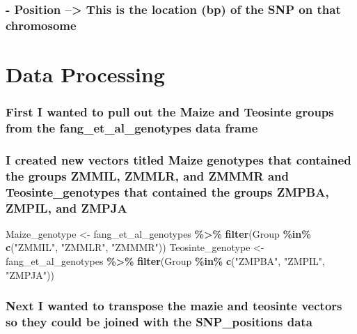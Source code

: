 \documentclass[
]{article}
\newenvironment{Shaded}{\begin{snugshade}}{\end{snugshade}}
\newcommand{\FunctionTok}[1]{\textcolor[rgb]{0.13,0.29,0.53}{\textbf{#1}}}
\newcommand{\NormalTok}[1]{#1}
\newcommand{\OtherTok}[1]{\textcolor[rgb]{0.56,0.35,0.01}{#1}}
\newcommand{\SpecialCharTok}[1]{\textcolor[rgb]{0.81,0.36,0.00}{\textbf{#1}}}
\newcommand{\StringTok}[1]{\textcolor[rgb]{0.31,0.60,0.02}{#1}}
\begin{document}
\subsubsection{- Position --\textgreater{} This is the location (bp) of
the SNP on that
chromosome}\label{position-this-is-the-location-bp-of-the-snp-on-that-chromosome}

\section{Data Processing}\label{data-processing}

\subsubsection{First I wanted to pull out the Maize and Teosinte groups
from the fang\_et\_al\_genotypes data
frame}\label{first-i-wanted-to-pull-out-the-maize-and-teosinte-groups-from-the-fang_et_al_genotypes-data-frame}

\subsubsection{I created new vectors titled Maize genotypes that
contained the groups ZMMIL, ZMMLR, and ZMMMR and Teosinte\_genotypes
that contained the groups ZMPBA, ZMPIL, and
ZMPJA}\label{i-created-new-vectors-titled-maize-genotypes-that-contained-the-groups-zmmil-zmmlr-and-zmmmr-and-teosinte_genotypes-that-contained-the-groups-zmpba-zmpil-and-zmpja}

\begin{Shaded}
\begin{Highlighting}[]
\NormalTok{Maize\_genotype }\OtherTok{\textless{}{-}}\NormalTok{ fang\_et\_al\_genotypes }\SpecialCharTok{\%\textgreater{}\%} \FunctionTok{filter}\NormalTok{(Group }\SpecialCharTok{\%in\%} \FunctionTok{c}\NormalTok{(}\StringTok{"ZMMIL"}\NormalTok{, }\StringTok{"ZMMLR"}\NormalTok{, }\StringTok{"ZMMMR"}\NormalTok{))}
\NormalTok{Teosinte\_genotype }\OtherTok{\textless{}{-}}\NormalTok{ fang\_et\_al\_genotypes }\SpecialCharTok{\%\textgreater{}\%} \FunctionTok{filter}\NormalTok{(Group }\SpecialCharTok{\%in\%} \FunctionTok{c}\NormalTok{(}\StringTok{"ZMPBA"}\NormalTok{, }\StringTok{"ZMPIL"}\NormalTok{, }\StringTok{"ZMPJA"}\NormalTok{))}
\end{Highlighting}
\end{Shaded}

\subsubsection{Next I wanted to transpose the mazie and teosinte vectors
so they could be joined with the SNP\_positions
data}\label{next-i-wanted-to-transpose-the-mazie-and-teosinte-vectors-so-they-could-be-joined-with-the-snp_positions-data}
\end{document}
